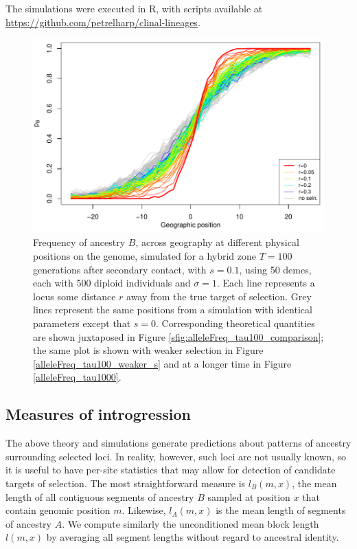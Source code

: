 \documentclass[11pt,letterpaper]{article}
\begin{document}
The simulations were executed in R, with scripts available at
\url{https://github.com/petrelharp/clinal-lineages}.

\begin{figure}
\includegraphics{figs/alleleFrequencies_sim.pdf}
\caption{
    Frequency of ancestry $B$,
    across geography at different physical positions on the genome, simulated for a hybrid zone
     $T=100$ generations after secondary contact, with $s=0.1$,
     using 50 demes, each with 500 diploid individuals and $\sigma=1$.
    Each line represents a locus some distance $r$ away from the true target of selection.
    Grey lines represent the same positions from a simulation with
    identical parameters except that $s=0$.
    Corresponding theoretical quantities are shown juxtaposed in Figure \ref{sfig:alleleFreq_tau100_comparison};
    the same plot is shown with weaker selection in Figure \ref{alleleFreq_tau100_weaker_s} and at a longer time in Figure \ref{alleleFreq_tau1000}.
}\label{alleleFreq_tau100}
\end{figure}

\subsection*{Measures of introgression}


The above theory and simulations generate predictions about patterns of ancestry surrounding selected loci. 
In reality, however, such loci are not usually known, so it is useful to have per-site statistics that may allow for detection of candidate targets of selection. 
The most straightforward measure is $l_B(m,x)$,  
the mean length of all contiguous segments of ancestry $B$ sampled at position $x$ that contain genomic position $m$.
Likewise, $l_A(m,x)$ is the mean length of segments of ancestry $A$.
We compute similarly the unconditioned mean block length $l(m,x)$
by averaging all segment lengths without regard to ancestral identity.
\end{document}
